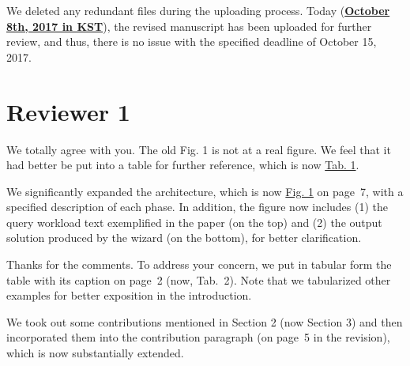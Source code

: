 \documentclass[10pt,letterpaper]{article}
\newenvironment{myindentpar}[1]%
{\begin{list}{}
         {\vspace{10pt}
					\setlength{\leftmargin}{#1}}
          \item[]
}
{\end{list}}
\newcommand{\rev}[1]{\begin{myindentpar}{.25in} {\em {\color{blue}{#1}}}\end{myindentpar}}
\begin{document}
We deleted any redundant files during the uploading process. Today ({\bf\underline{October 8th, 2017 in KST}}), the revised manuscript has been uploaded for further review, 
and thus, there is no issue with the specified deadline of October 15, 2017.

\clearpage
\section*{Reviewer 1}\label{sec:rev1}

\rev{
[Reviewer(s)' Comments to Author]:
Reviewer: 1

Comments to the Author
Generally Fig1. is not a figure scale and can be considered as a structure rather aha a Fig. 1. technically, the primary figures are the general scale and structure of the method which tends to grasp the authors' attention and must be clarified. 
}

We totally agree with you. The old Fig. 1 is not at a real figure. We feel that it had better be put into a table for further reference, which is now {\color{blue}\underline{Tab. 1}}.

\rev{
The presented Wizard Architecture in Fig. 2 needs to be expanded. 
}

We significantly expanded the architecture, which is now {\color{blue}\underline{Fig. 1}} on page~7, with a specified description of each phase. In addition, the figure now includes (1) the query workload text exemplified in the paper (on the top) and (2) the output solution 
produced by the wizard (on the bottom), for better clarification.

\rev{
The table in Page3 does not have any caption to introduces besides, its location is badly organized.
}
Thanks for the comments. To address your concern, we put in tabular form the table with its caption on page~2 (now, {\color{blue}Tab.~2}). 
Note that we tabularized other examples for better exposition in the introduction.

\rev{
The main contribution of the paper is so limited and needs to be extended in Section 1. 
} 
We took out some contributions mentioned in Section 2 (now Section 3) and then incorporated them into the contribution paragraph (on page~5 
in the revision), which is now substantially extended. 

\rev{ 
In the experiment environmental setting, the deployment in realistic datasets are missing and must be indicated for the reproduction of the future readers.  
}
\end{document}
